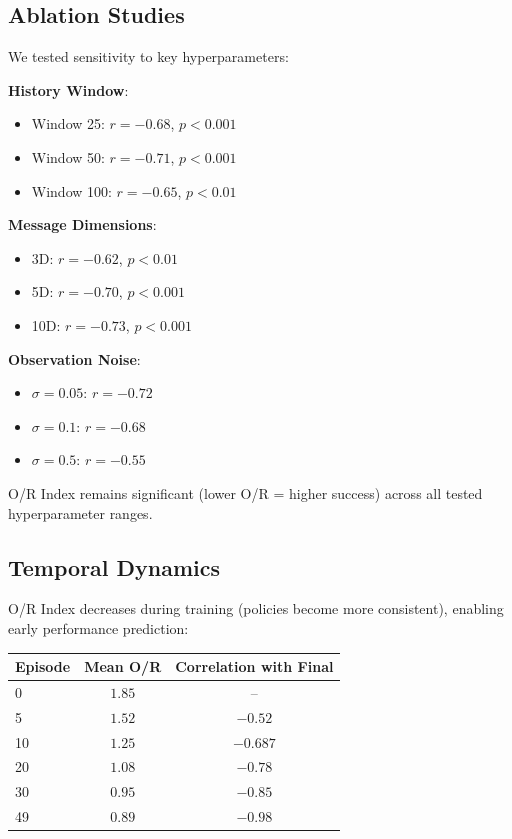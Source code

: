 \documentclass[twoside]{article}
\theoremstyle{remark}
\begin{document}
\subsection{Ablation Studies}

We tested sensitivity to key hyperparameters:

\textbf{History Window}:
\begin{itemize}
    \item Window 25: $r = -0.68$, $p < 0.001$
    \item Window 50: $r = -0.71$, $p < 0.001$
    \item Window 100: $r = -0.65$, $p < 0.01$
\end{itemize}

\textbf{Message Dimensions}:
\begin{itemize}
    \item 3D: $r = -0.62$, $p < 0.01$
    \item 5D: $r = -0.70$, $p < 0.001$
    \item 10D: $r = -0.73$, $p < 0.001$
\end{itemize}

\textbf{Observation Noise}:
\begin{itemize}
    \item $\sigma = 0.05$: $r = -0.72$
    \item $\sigma = 0.1$: $r = -0.68$
    \item $\sigma = 0.5$: $r = -0.55$
\end{itemize}

O/R Index remains significant (lower O/R = higher success) across all tested hyperparameter ranges.

\subsection{Temporal Dynamics}

O/R Index decreases during training (policies become more consistent), enabling early performance prediction:

\begin{center}
\begin{tabular}{lcc}
\toprule
\textbf{Episode} & \textbf{Mean O/R} & \textbf{Correlation with Final} \\
\midrule
0 & $1.85$ & -- \\
5 & $1.52$ & $-0.52$ \\
10 & $1.25$ & $-0.687$ \\
20 & $1.08$ & $-0.78$ \\
30 & $0.95$ & $-0.85$ \\
49 & $0.89$ & $-0.98$ \\
\bottomrule
\end{tabular}
\end{center}
\end{document}

